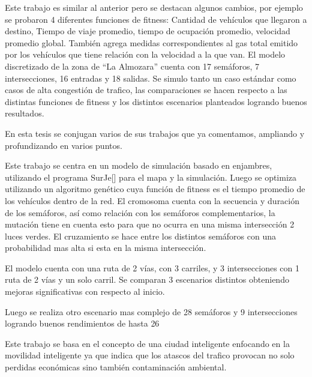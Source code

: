 \begin{itemize}
	\begin{item}
Este trabajo es similar al anterior pero se destacan algunos cambios, por ejemplo se probaron 4 diferentes funciones de fitness: Cantidad de vehículos que llegaron a destino, Tiempo de viaje promedio, tiempo de ocupación promedio, velocidad promedio global.
También agrega medidas correspondientes al gas total emitido por los vehículos que tiene relación con la velocidad a la que van.
El modelo discretizado de la zona de “La Almozara” cuenta con 17 semáforos, 7 intersecciones, 16 entradas y 18 salidas.
Se simulo tanto un caso estándar como casos de alta congestión de trafico, las comparaciones se hacen respecto a las distintas funciones de fitness y los distintos escenarios planteados logrando buenos resultados.
	
	\end{item}
	
	\begin{item}
		\bibentry{Sanchez2007}
En esta tesis se conjugan varios de sus trabajos que ya comentamos, ampliando y profundizando en varios puntos.	
	\end{item}	

	\begin{item}
		\bibentry{Penner2002}
Este trabajo se centra en un modelo de simulación basado en enjambres, utilizando el programa SurJe[] para el mapa y la simulación. Luego se optimiza utilizando un algoritmo genético cuya función de fitness es el tiempo promedio de los vehículos dentro de la red. El cromosoma cuenta con la secuencia y duración de los semáforos, así como relación con los semáforos complementarios, la mutación tiene en cuenta esto para que no ocurra en una misma intersección 2 luces verdes. El cruzamiento se hace entre los distintos semáforos con una probabilidad mas alta si esta en la misma intersección.

El modelo cuenta con una ruta de 2 vías, con 3 carriles, y 3 intersecciones con 1 ruta de 2 vías y un solo carril.
Se comparan 3 escenarios distintos obteniendo mejoras significativas con respecto al inicio.

Luego se realiza otro escenario mas complejo de 28 semáforos  y 9 intersecciones logrando buenos rendimientos de hasta 26%
	\end{item}	
	
	
	\begin{item}
		\bibentry{Stolfi2012}
Este trabajo se basa en el concepto de una ciudad inteligente enfocando en la movilidad inteligente ya que indica que los atascos del trafico provocan no solo perdidas económicas sino también contaminación ambiental.


\end{item}
\end{itemize}
